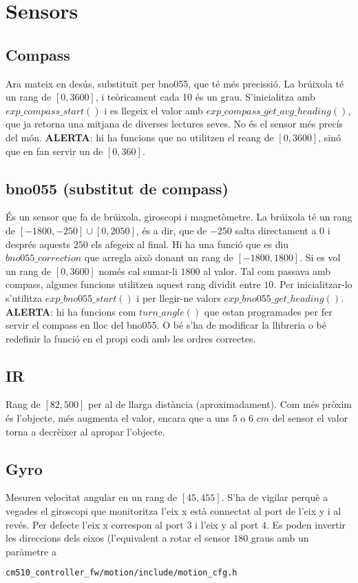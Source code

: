 \documentclass{article}
\begin{document}
\section{Sensors}
\subsection{Compass} Ara mateix en desús, substituït per bno055, que té més precissió. La brúixola té un rang de $[0, 3600]$, i teòricament cada 10 és un grau. S'inicialitza amb $exp\_compass\_start()$ i es llegeix el valor amb $exp\_compass\_get\_avg\_heading()$, que ja retorna una mitjana de diverses lectures seves. No és el sensor més precís del món. \textbf{ALERTA}: hi ha funcions que no utilitzen el reang de $[0, 3600]$, sinó que en fan servir un de $[0, 360]$.
\subsection{bno055 (substitut de compass)}
És un sensor que fa de brúixola, giroscopi i magnetòmetre. La brúixola té un rang de $[-1800, -250]\cup [0, 2050]$, és a dir, que de $-250$ salta directament a $0$ i després aquests $250$ els afegeix al final. Hi ha una funció que es diu $bno055\_correction$ que arregla això donant un rang de $[-1800, 1800]$. Si es vol un rang de $[0, 3600]$ només cal sumar-li $1800$ al valor. Tal com passava amb compass, algunes funcions utilitzen aquest rang dividit entre $10$. Per inicialitzar-lo s'utilitza $exp\_bno055\_start()$ i per llegir-ne valors $exp\_bno055\_get\_heading()$. \textbf{ALERTA}: hi ha funcions com $turn\_angle()$ que estan programades per fer servir el compass en lloc del bno055. O bé s'ha de modificar la llibreria o bé redefinir la funció en el propi codi amb les ordres correctes.

\subsection{IR}
Rang de $[82, 500]$ per al de llarga distància (aproximadament). Com més pròxim és l'objecte, més augmenta el valor, encara que a uns $5$ o $6$ $cm$ del sensor el valor torna a decrèixer al apropar l'objecte.

\subsection{Gyro} 
Mesuren velocitat angular en un rang de $[45, 455]$. S'ha de vigilar perquè a vegades el giroscopi que monitoritza l'eix x està connectat al port de l'eix y i al revés. Per defecte l'eix x correspon al port $3$ i l'eix y al port $4$. Es poden invertir les direccions dels eixos (l'equivalent a rotar el sensor $180$ graus amb un paràmetre a 
\begin{lstlisting}[language=bash]
cm510_controller_fw/motion/include/motion_cfg.h
\end{lstlisting}
\\
\end{document}
